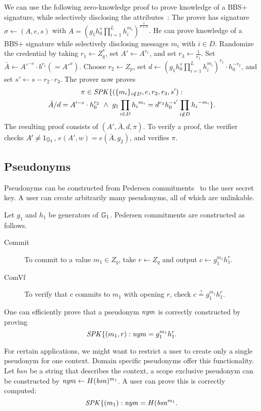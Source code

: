 We can use the following zero-knowledge proof to prove knowledge of a BBS+ signature, while selectively disclosing the attributes~\cite{CDL16eprint}:
The prover has signature $\sigma \gets (A, e, s)$ with $A = (g_1 h_0^s \prod_{i = 1}^{L} h_i^{m_{i}})^{\frac{1}{e+x}}$.
He can prove knowledge of a BBS+ signature while selectively disclosing messages $m_i$ with $i \in D$.
Randomize the credential by taking $r_1 \gets Z_q^*$, set $A' \gets A^{r_1}$, and set $r_3 \gets \frac{1}{r_1}$.
Set $\bar{A} \gets A'^{-e} \cdot b^{r_1} (= A'^{x})$.
Choose $r_2 \gets Z_p$, set $d \gets (g_1 h_0^s \prod_{i = 1}^{L} h_i^{m_{i}})^{r_1} \cdot h_0^{-r_2}$, and set $s' \gets s - r_2 \cdot r_3$.
The prover now proves 
\begin{multline*}
\pi \in \mathit{SPK}\{(\{m_i\}_{i \notin D}, e, r_2, r_3, s') : \\
\bar{A}/d = A'^{-e} \cdot h_0^{r_2} ~\land~ g_1 \prod_{i \in D} {h_{i}}^{m_i}= d^{r_3}h_0^{-s'} \prod_{i \notin D} {h_{i}}^{-m_i}\}.
\end{multline*}
The resulting proof consists of $(A', \bar{A}, d, \pi)$.
To verify a proof, the verifier checks $A' \neq 1_{\mathbb{G}_1}$, $e(A', w) = e(\bar{A}, g_2)$, and verifies $\pi$.

\subsection{Pseudonyms}
Pseudonyms can be constructed from Pedersen commitments~\cite{peders91b} to the user secret key.
A user can create arbitrarily many pseudonyms, all of which are unlinkable.

Let $g_1$ and $h_1$ be generators of $\mathbb{G}_1$. 
Pedersen commitments are constructed as follows.
\begin{description}
\item[Commit] To commit to a value $m_1 \in Z_q$, take $r \gets Z_q$ and output $c \gets g_1^{m_1}h_1^r$.
\item[ComVf] To verify that $c$ commits to $m_1$ with opening $r$, check $c \stackrel{?}{=} g_1^{m_1}h_1^r$.
\end{description}

One can efficiently prove that a pseudonym $\mathit{nym}$ is correctly constructed by proving 
\[\mathit{SPK}\{(m_1, r) : \mathit{nym} = g_1^{m_1} h_1^r .\]

For certain applications, we might want to restrict a user to create only a single pseudonym for one context.
Domain specific pseudonyms offer this functionality. 
Let $\mathit{bsn}$ be a string that describes the context, a scope exclusive pseudonym can be constructed by $\mathit{nym} \gets H(\mathit{bsn})^{m_1}$. 
A user can prove this is correctly computed:
\[\mathit{SPK}\{(m_1) : \mathit{nym} = H(\mathit{bsn}^{m_1} .\]


